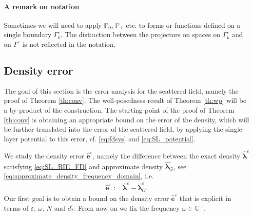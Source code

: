 \documentclass[]{article}
\numberwithin{equation}{section}
\numberwithin{theorem}{section}
\numberwithin{lemma}{section}
\numberwithin{corollary}{section}
\numberwithin{proposition}{section}
\numberwithin{definition}{section}
\newcommand{\re}{\varepsilon}
\renewcommand{\vec}{\boldsymbol}
\begin{document}
	
	
	\paragraph{A remark on notation} Sometimes we will need to apply $\mathbb{P}_{0}$, $\mathbb{P}_{\perp}$ etc. to forms or functions defined on a single boundary $\Gamma_k^{\re}$. The distinction between the projectors on spaces on  $\Gamma_k^{\re}$ and on $\Gamma^{\re}$ is not reflected in the notation.
	\subsection{Density error}
	\label{sec:analysis_freq_domain}
	The goal of this section is the error analysis for the scattered field, namely the proof of Theorem \ref{th:conv}. The well-posedness result of Theorem \ref{th:wp} will be a by-product of the construction. 
	The starting point of the proof of Theorem \ref{th:conv} is obtaining an appropriate bound on the error of the density, which will be further translated into the error of the scattered field, by applying the single-layer potential to this error, cf. \eqref{eq:fdsys} and \eqref{eq:SL_potential}. 
	
	We study the density error $\hat{\boldsymbol{e}}^{\re}$, namely the difference between the exact density $\hat{\vec{\lambda}}^{\re}$ satisfying  \eqref{eq:SL_BIE_FD} and approximate density $\hat{\vec{\lambda}}^{\re}_G$, see \eqref{eq:approximate_density_frequency_domain}, i.e. 
	\begin{align*}%
		\hat{\vec{e}}^{\re} := \hat{\vec{\lambda}}^{\re} - \hat{\vec{\lambda}}^{\re}_G.
	\end{align*}
	Our first goal is to obtain a bound on the density error $\hat{\vec{e}}^{\re}$ that is explicit in terms of $\re$, $\omega$, $N$ and $d_*^{\re}$. From now on we fix the frequency $\omega\in \mathbb{C}^+$. 
	
\end{document}

